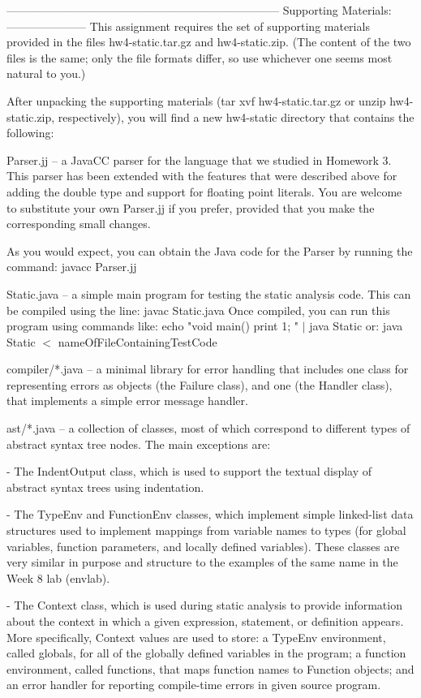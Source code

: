 \documentclass{article}
\begin{document}
------------------------------------------------------------------------
Supporting Materials:
---------------------
This assignment requires the set of supporting materials provided in
the files hw4-static.tar.gz and hw4-static.zip.  (The content of the
two files is the same; only the file formats differ, so use whichever
one seems most natural to you.)

After unpacking the supporting materials (tar xvf hw4-static.tar.gz
or unzip hw4-static.zip, respectively), you will find a new hw4-static
directory that contains the following:

Parser.jj -- a JavaCC parser for the language that we studied in
  Homework 3.  This parser has been extended with the features
  that were described above for adding the double type and support
  for floating point literals.  You are welcome to substitute
  your own Parser.jj if you prefer, provided that you make the
  corresponding small changes.

  As you would expect, you can obtain the Java code for the Parser
  by running the command:  javacc Parser.jj

Static.java -- a simple main program for testing the static analysis
  code.  This can be compiled using the line: javac Static.java
  Once compiled, you can run this program using commands like:
        echo "void main() { print 1; }" $|$ java Static 
  or:   java Static $<$ nameOfFileContainingTestCode

compiler/*.java -- a minimal library for error handling that includes
  one class for representing errors as objects (the Failure class),
  and one (the Handler class), that implements a simple error message
  handler.

ast/*.java -- a collection of classes, most of which correspond to
  different types of abstract syntax tree nodes.  The main exceptions
  are:

  - The IndentOutput class, which is used to support the textual
    display of abstract syntax trees using indentation.

  - The TypeEnv and FunctionEnv classes, which implement simple
    linked-list data structures used to implement mappings from
    variable names to types (for global variables, function
    parameters, and locally defined variables).  These classes are
    very similar in purpose and structure to the examples of the
    same name in the Week 8 lab (envlab).

  - The Context class, which is used during static analysis to
    provide information about the context in which a given
    expression, statement, or definition appears.  More
    specifically, Context values are used to store: a TypeEnv
    environment, called globals, for all of the globally defined
    variables in the program; a function environment, called
    functions, that maps function names to Function objects; and
    an error handler for reporting compile-time errors in given
    source program.
\end{document}
